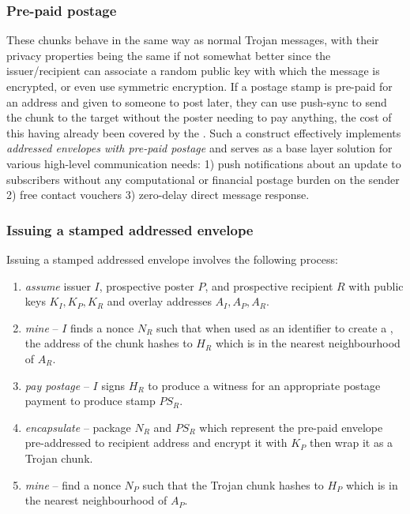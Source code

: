 \subsubsection{Pre-paid postage}

These chunks behave in the same way as normal Trojan messages, with their privacy properties being the same if not somewhat better since the issuer/recipient can associate a random public key with which the message is encrypted, or even use symmetric encryption. If a postage stamp is pre-paid for an address and given to someone to post later, they can use push-sync to send the chunk to the target without the poster needing to pay anything, the cost of this having already been covered by the . Such a construct effectively implements \emph{addressed envelopes with pre-paid postage} and serves as a base layer solution for various high-level communication needs: 1) push notifications about an update to subscribers without any computational or financial postage burden on the sender 2) free contact vouchers 3) zero-delay direct message response.  


\subsubsection{Issuing a stamped addressed envelope}

Issuing a stamped addressed envelope involves the following process:

\begin{enumerate}[noitemsep]
\item \emph{assume} issuer $I$, prospective poster $P$, and prospective recipient $R$ with public keys $K_I, K_P, K_R$ and overlay addresses $A_I, A_P, A_R$.
\item \emph{mine} -- $I$ finds a nonce $N_R$ such that when used as an identifier to create a , the  address of the chunk hashes to $H_R$ which is in the nearest neighbourhood of $A_R$.
\item \emph{pay postage} -- $I$ signs $H_R$ to produce a witness for an appropriate postage payment to produce stamp $PS_R$.
\item \emph{encapsulate} -- package $N_R$ and $PS_R$ which represent the pre-paid envelope pre-addressed to recipient address and encrypt it with $K_P$ then wrap it as a Trojan chunk.
\item \emph{mine} -- find a nonce $N_P$ such that the Trojan chunk hashes to $H_P$ which is in the nearest neighbourhood of $A_P$. 
\end{enumerate}




